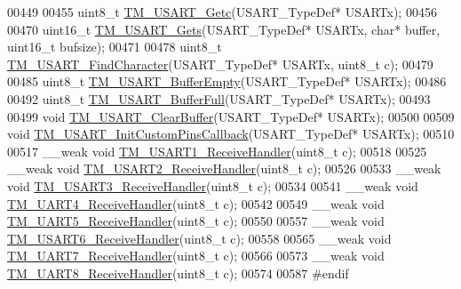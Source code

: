 \begin{DoxyCode}
00449 
00455 uint8\_t \hyperlink{group___t_m___u_s_a_r_t___functions_ga340391d061340e4635b4bbafea23602b}{TM\_USART\_Getc}(USART\_TypeDef* USARTx);
00456 
00470 uint16\_t \hyperlink{group___t_m___u_s_a_r_t___functions_gabb0a95fd20e5e2a894e658b64a29ee61}{TM\_USART\_Gets}(USART\_TypeDef* USARTx, \textcolor{keywordtype}{char}* buffer, uint16\_t bufsize);
00471 
00478 uint8\_t \hyperlink{group___t_m___u_s_a_r_t___functions_ga5f708a330c9fc45032143a5777d9b6fd}{TM\_USART\_FindCharacter}(USART\_TypeDef* USARTx, uint8\_t c);
00479 
00485 uint8\_t \hyperlink{group___t_m___u_s_a_r_t___functions_gabcee39f90c8c33ff3b1fb07e6496eef6}{TM\_USART\_BufferEmpty}(USART\_TypeDef* USARTx);
00486 
00492 uint8\_t \hyperlink{group___t_m___u_s_a_r_t___functions_ga0bf136abba24771c4a5a83ace52a76c1}{TM\_USART\_BufferFull}(USART\_TypeDef* USARTx);
00493 
00499 \textcolor{keywordtype}{void} \hyperlink{group___t_m___u_s_a_r_t___functions_ga6c8dfcc950305f511393240ea847b2ad}{TM\_USART\_ClearBuffer}(USART\_TypeDef* USARTx);
00500 
00509 \textcolor{keywordtype}{void} \hyperlink{group___t_m___u_s_a_r_t___functions_ga299f46d68e55bc8e5054ac3eef9e39ee}{TM\_USART\_InitCustomPinsCallback}(USART\_TypeDef* USARTx);
00510 
00517 \_\_weak \textcolor{keywordtype}{void} \hyperlink{group___t_m___u_s_a_r_t___functions_gafbf9e2222953815c9f35cd46863dbc26}{TM\_USART1\_ReceiveHandler}(uint8\_t c);
00518 
00525 \_\_weak \textcolor{keywordtype}{void} \hyperlink{group___t_m___u_s_a_r_t___functions_ga21823124b3d98ea2085671f4a5af6017}{TM\_USART2\_ReceiveHandler}(uint8\_t c);
00526 
00533 \_\_weak \textcolor{keywordtype}{void} \hyperlink{group___t_m___u_s_a_r_t___functions_ga868eb8844f04487e714b63b016a93bae}{TM\_USART3\_ReceiveHandler}(uint8\_t c);
00534 
00541 \_\_weak \textcolor{keywordtype}{void} \hyperlink{group___t_m___u_s_a_r_t___functions_gada9d723469cf9d7d0ac11930b8e14f2a}{TM\_UART4\_ReceiveHandler}(uint8\_t c);
00542 
00549 \_\_weak \textcolor{keywordtype}{void} \hyperlink{group___t_m___u_s_a_r_t___functions_ga4338d265fa58103332ea234f63594b81}{TM\_UART5\_ReceiveHandler}(uint8\_t c);
00550 
00557 \_\_weak \textcolor{keywordtype}{void} \hyperlink{group___t_m___u_s_a_r_t___functions_ga65c1d6a6bcc2dbd40ea0e7cbf5e924de}{TM\_USART6\_ReceiveHandler}(uint8\_t c);
00558 
00565 \_\_weak \textcolor{keywordtype}{void} \hyperlink{group___t_m___u_s_a_r_t___functions_ga461a5123a57231d34d51330f12ea39d2}{TM\_UART7\_ReceiveHandler}(uint8\_t c);
00566 
00573 \_\_weak \textcolor{keywordtype}{void} \hyperlink{group___t_m___u_s_a_r_t___functions_ga37fe7ffa31a540627af5ebfe93f2dcf5}{TM\_UART8\_ReceiveHandler}(uint8\_t c);
00574 
00587 \textcolor{preprocessor}{#endif}
\end{DoxyCode}
